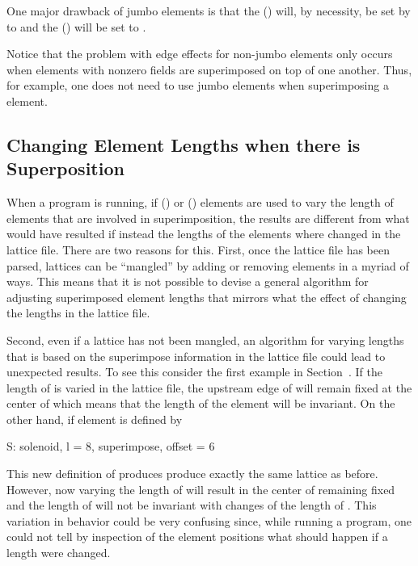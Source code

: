 One major drawback of jumbo  elements is that the
 () will, by necessity, be set by \bmad to
 and the  () will be set to
.

Notice that the problem with edge effects for non-jumbo
 elements only occurs when elements with nonzero
fields are superimposed on top of one another. Thus, for example, one
does not need to use jumbo elements when superimposing a 
element.

\subsection{Changing Element Lengths when there is Superposition}
\label{s:super.length}

When a program is running, if  () or
 () elements are used to vary the length
of elements that are involved in superimposition, the results are
different from what would have resulted if instead the lengths of the
elements where changed in the lattice file. There are two reasons for
this. First, once the lattice file has been parsed, lattices can be
``mangled'' by adding or removing elements in a myriad of ways. This
means that it is not possible to devise a general algorithm for
adjusting superimposed element lengths that mirrors what the effect of
changing the lengths in the lattice file.

Second, even if a lattice has not been mangled, an algorithm for
varying lengths that is based on the superimpose information in the
lattice file could lead to unexpected results. To see this consider
the first example in Section~. If the length of 
is varied in the lattice file, the upstream edge of  will remain
fixed at the center of  which means that the length of the
 element  will be invariant. On the other
hand, if element  is defined by 
\begin{example}
  S: solenoid, l = 8, superimpose, offset = 6
\end{example}
This new definition of  produces produce exactly the same
lattice as before. However, now varying the length of  will
result in the center of  remaining fixed and the length of
 will not be invariant with changes of the length of
. This variation in behavior could be very confusing since,
while running a program, one could not tell by inspection of the
element positions what should happen if a length were changed.

